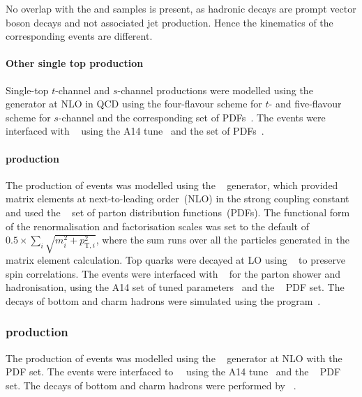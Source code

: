 No overlap with the \Wjets and \Zjets samples is present, as hadronic decays
are prompt vector boson decays and not associated jet production. Hence the kinematics
of the corresponding events are different.

\paragraph*{Other single top production}

Single-top \(t\)-channel and \(s\)-channel productions were modelled using the
\POWHEGBOX[v2]~\cite{Frederix:2012dh,Alioli:2009je,Nason:2004rx,Frixione:2007vw,Alioli:2010xd}
generator at NLO in QCD using the four-flavour scheme for \(t\)- and five-flavour scheme for \(s\)-channel and the
corresponding \NNPDF[3.0nlo] set of PDFs~\cite{Ball:2014uwa}.  The events were
interfaced with \PYTHIA[8.230]~\cite{Sjostrand:2014zea} using the A14
tune~\cite{ATL-PHYS-PUB-2014-021} and the \NNPDF[2.3lo] set of
PDFs~\cite{Ball:2012cx}.


\paragraph*{\ttV production}

The production of \ttV events was modelled using the \MGNLO[2.3.3]~\cite{Alwall:2014hca}
generator, which provided matrix elements at
next-to-leading order~(NLO) in the strong coupling constant \alphas
and used the \NNPDF[3.0nlo]~\cite{Ball:2014uwa} set of parton distribution
functions~(PDFs). The functional form of the renormalisation and
factorisation scales was set to the default of
\(0.5 \times \sum_i \sqrt{m^2_i+p^2_{\mathrm{T},i}}\),
where the sum runs over all the particles
generated in the matrix element calculation. Top quarks were decayed
at LO using \MADSPIN~\cite{Frixione:2007zp,Artoisenet:2012st} to
preserve spin correlations. The events were interfaced with
\PYTHIA[8.210]~\cite{Sjostrand:2014zea} for the parton shower and
hadronisation, using the A14 set of tuned
parameters~\cite{ATL-PHYS-PUB-2014-021} and the
\NNPDF[2.3lo]~\cite{Ball:2014uwa} PDF set.
The decays of bottom and charm hadrons were simulated using the \EVTGEN[1.2.0] program~\cite{Lange:2001uf}.


\subsubsection*{\ttH production}

The production of \ttH events was modelled using the
\POWHEGBOX[v2]~\cite{Frixione:2007nw,Nason:2004rx,Frixione:2007vw,Alioli:2010xd,Hartanto:2015uka}
generator at NLO with the \NNPDF[3.0nlo]~\cite{Ball:2014uwa} PDF set.
The events were interfaced to \PYTHIA[8.230]~\cite{Sjostrand:2014zea}~using
the A14 tune~\cite{ATL-PHYS-PUB-2014-021} and the
\NNPDF[2.3lo]~\cite{Ball:2014uwa} PDF set. The decays of bottom and charm hadrons
were performed by \EVTGEN[1.6.0]~\cite{Lange:2001uf}.
